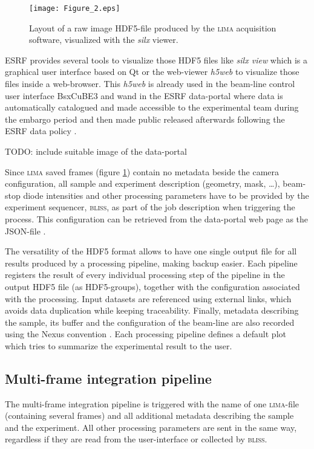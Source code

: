 \documentclass[preprint]{iucr}              %
\begin{document}
\begin{figure}
     \caption{Layout of a raw image HDF5-file produced by the \textsc{lima} acquisition software, visualized with the \textit{silx} viewer.}
     \texttt{[image: Figure\_2.eps]}
     \label{lima}
\end{figure}

ESRF provides several tools to visualize those HDF5 files like \textit{silx view} \cite{silx} which is a graphical user interface based on Qt \cite{pyqt} or the web-viewer \textit{h5web} \cite{h5web} to visualize those files inside a web-browser.
This \textit{h5web} is already used in the beam-line control user interface BsxCuBE3 \cite{bm29_2022} and wand in the ESRF data-portal \cite{data-portal} where data is automatically catalogued and made accessible to the experimental team during the embargo period and then made public released afterwards following the ESRF data policy \cite{data-policy}. 

TODO: include suitable image of the data-portal

Since \textsc{lima} saved frames (figure \ref{lima}) contain no metadata beside the camera configuration, all sample and experiment description (geometry, mask, \ldots), beam-stop diode intensities and other processing parameters have to be provided by the experiment sequencer, \textsc{bliss}, as part of the job description when triggering the process. 
This configuration can be retrieved from the data-portal web page as the JSON-file \cite{json}.

The versatility of the HDF5 format allows to have one single output file for all results produced by a processing pipeline, making backup easier.
Each pipeline registers the result of every individual processing step of the pipeline in the output HDF5 file (as HDF5-groups), together with the configuration associated with the processing.
Input datasets are referenced using external links, which avoids data duplication while keeping traceability. 
Finally, metadata describing the sample, its buffer and the configuration of the beam-line are also recorded using the Nexus convention \cite{nexus}.
Each processing pipeline defines a default plot which tries to summarize the experimental result to the user.

\subsection{Multi-frame integration pipeline}
\label{multiframe_pipeline}
The multi-frame integration pipeline is triggered with the name of one \textsc{lima}-file (containing several frames) and all additional metadata describing the sample and the experiment.
All other processing parameters are sent in the same way, regardless if they are read from the user-interface or collected by \textsc{bliss}.
\end{document}
